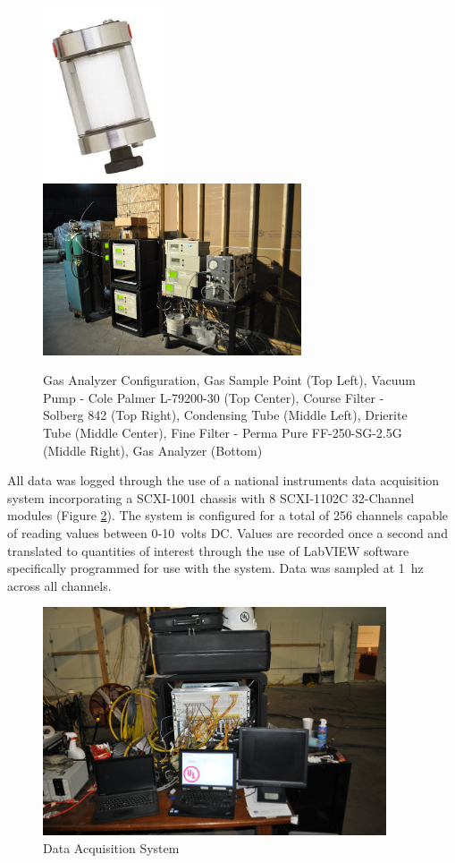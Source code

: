 \documentclass[12pt,oneside]{book}
\begin{document}
\begin{figure}[H]
	\includegraphics[height = 2in]{0_Images/Instrumentation/Gas_Analyzer/FineFilter.jpg} \\
	\includegraphics[height = 2in]{0_Images/Instrumentation/Gas_Analyzer/GasAnalyzers.jpg}
	\caption[Gas Analyzer Configuration]{Gas Analyzer Configuration, Gas Sample Point (Top Left), Vacuum Pump - Cole Palmer L-79200-30 (Top Center), Course Filter - Solberg 842 (Top Right), Condensing Tube (Middle Left), Drierite Tube (Middle Center), Fine Filter - Perma Pure FF-250-SG-2.5G (Middle Right), Gas Analyzer (Bottom)}
	\label{fig:GasAnalyzers}
\end{figure}

All data was logged through the use of a national instruments data acquisition system incorporating a SCXI-1001 chassis with 8 SCXI-1102C 32-Channel modules (Figure \ref{fig:DataSystem}). The system is configured for a total of 256 channels capable of reading values between 0-10~volts DC. Values are recorded once a second and translated to quantities of interest through the use of LabVIEW software specifically programmed for use with the system. Data was sampled at 1~hz across all channels.

\begin{figure}[H]
	\centering
	\includegraphics[width = 4in]{../0_Images/Instrumentation/DataSystem.jpg}
	\caption{Data Acquisition System}
	\label{fig:DataSystem}
\end{figure}
\end{document}
